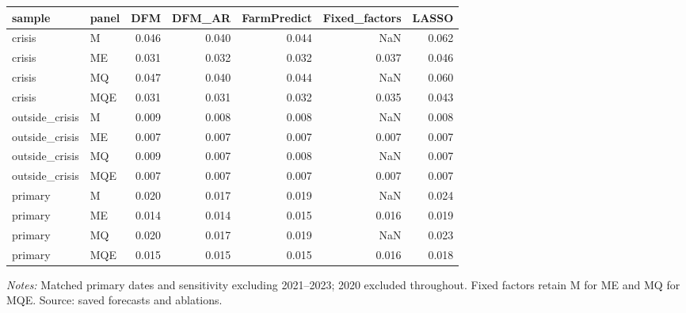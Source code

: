 \begin{threeparttable}
\begin{tabular}{llrrrrr}
\toprule
sample & panel & DFM & DFM\_AR & FarmPredict & Fixed\_factors & LASSO \\
\midrule
crisis & M & 0.046 & 0.040 & 0.044 & NaN & 0.062 \\
crisis & ME & 0.031 & 0.032 & 0.032 & 0.037 & 0.046 \\
crisis & MQ & 0.047 & 0.040 & 0.044 & NaN & 0.060 \\
crisis & MQE & 0.031 & 0.031 & 0.032 & 0.035 & 0.043 \\
outside\_crisis & M & 0.009 & 0.008 & 0.008 & NaN & 0.008 \\
outside\_crisis & ME & 0.007 & 0.007 & 0.007 & 0.007 & 0.007 \\
outside\_crisis & MQ & 0.009 & 0.007 & 0.008 & NaN & 0.007 \\
outside\_crisis & MQE & 0.007 & 0.007 & 0.007 & 0.007 & 0.007 \\
primary & M & 0.020 & 0.017 & 0.019 & NaN & 0.024 \\
primary & ME & 0.014 & 0.014 & 0.015 & 0.016 & 0.019 \\
primary & MQ & 0.020 & 0.017 & 0.019 & NaN & 0.023 \\
primary & MQE & 0.015 & 0.015 & 0.015 & 0.016 & 0.018 \\
\bottomrule
\end{tabular}
\begin{tablenotes}[flushleft]\footnotesize
\item \textit{Notes:} Matched primary dates and sensitivity excluding 2021--2023; 2020 excluded throughout. Fixed factors retain M for ME and MQ for MQE. Source: saved forecasts and ablations.
\end{tablenotes}
\end{threeparttable}
